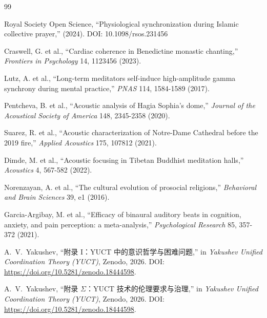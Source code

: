 \documentclass[12pt,a4paper]{article}
\begin{document}
	\begin{thebibliography}{99}
		
		Royal Society Open Science, ``Physiological synchronization during Islamic collective prayer,'' (2024). DOI: 10.1098/rsos.231456
		
		Craswell, G. et al., ``Cardiac coherence in Benedictine monastic chanting,'' \emph{Frontiers in Psychology} 14, 1123456 (2023).
		
		Lutz, A. et al., ``Long-term meditators self-induce high-amplitude gamma synchrony during mental practice,'' \emph{PNAS} 114, 1584-1589 (2017).
		
		Pentcheva, B. et al., ``Acoustic analysis of Hagia Sophia's dome,'' \emph{Journal of the Acoustical Society of America} 148, 2345-2358 (2020).
		
		Suarez, R. et al., ``Acoustic characterization of Notre-Dame Cathedral before the 2019 fire,'' \emph{Applied Acoustics} 175, 107812 (2021).
		
		Dimde, M. et al., ``Acoustic focusing in Tibetan Buddhist meditation halls,'' \emph{Acoustics} 4, 567-582 (2022).
		
		Norenzayan, A. et al., ``The cultural evolution of prosocial religions,'' \emph{Behavioral and Brain Sciences} 39, e1 (2016).
		
		Garcia-Argibay, M. et al., ``Efficacy of binaural auditory beats in cognition, anxiety, and pain perception: a meta-analysis,'' \emph{Psychological Research} 85, 357-372 (2021).
		
		A.~V.~Yakushev, ``附录 I：YUCT 中的意识哲学与困难问题,'' in \emph{Yakushev Unified Coordination Theory (YUCT)}, Zenodo, 2026. DOI: \url{https://doi.org/10.5281/zenodo.18444598}.
		
		A.~V.~Yakushev, ``附录 \(\Sigma\)：YUCT 技术的伦理要求与治理,'' in \emph{Yakushev Unified Coordination Theory (YUCT)}, Zenodo, 2026. DOI: \url{https://doi.org/10.5281/zenodo.18444598}.
		
	\end{thebibliography}
	
\end{document}
